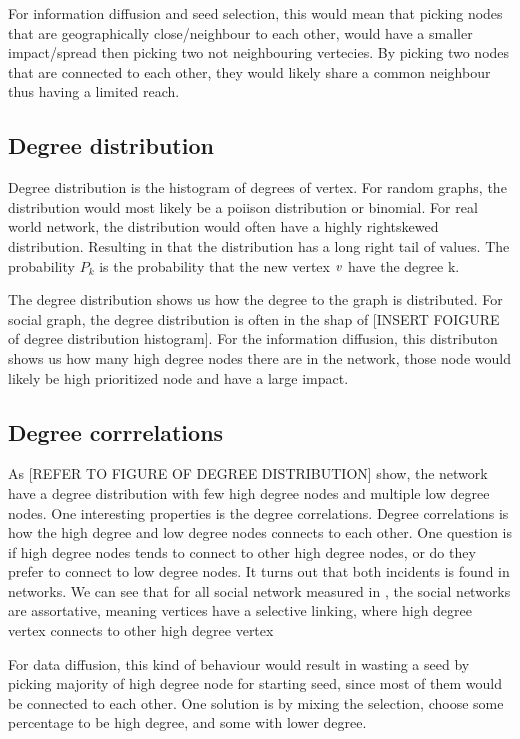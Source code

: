 For information diffusion and seed selection, this would mean that picking nodes that are geographically close/neighbour to each other, would have a smaller impact/spread then picking two not neighbouring vertecies. By picking two nodes that are connected to each other, they would likely share a common neighbour thus having a limited reach.  

\subsection{Degree distribution}
Degree distribution is the histogram of degrees of vertex. For random graphs, the distribution would most likely be a poiison distribution or binomial. For real world network, the distribution would often have a highly rightskewed distribution. Resulting in that the distribution has a long right tail of values. The probability $P_k$ is the probability that the new vertex $\it{v}$ have the degree k. 

The degree distribution shows us how the degree to the graph is distributed. For social graph, the degree distribution is often in the shap of [INSERT FOIGURE of degree distribution histogram]. For the information diffusion, this distributon shows us how many high degree nodes there are in the network, those node would likely be high prioritized node and have a large impact. 

\subsection{Degree corrrelations}
As [REFER TO FIGURE OF DEGREE DISTRIBUTION] show, the network have a degree distribution with few high degree nodes and multiple low degree nodes. One interesting properties is the degree correlations. Degree correlations is how the high degree and low degree nodes connects to each other. One question is if high degree nodes tends to connect to other high degree nodes, or do they prefer to connect to low degree nodes. It turns out that both incidents is found in networks\cite{complexNetwork}. We can see that for all social network measured in \cite{complexNetwork}, the social networks are assortative, meaning vertices have a selective linking, where high degree vertex connects to other high degree vertex\cite{AssortativeMixing2002} 

For data diffusion, this kind of behaviour would result in wasting a seed by picking majority of high degree node for starting seed, since most of them would be connected to each other. One solution is by mixing the selection, choose some percentage to be high degree, and some with lower degree.



